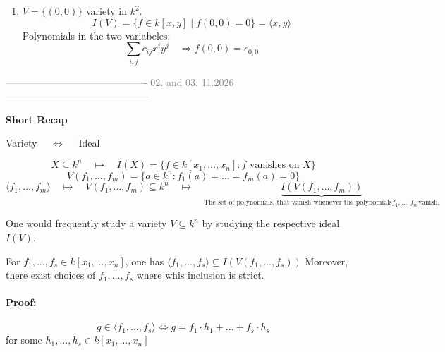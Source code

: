 \begin{example}[title = Example 1.4.9]
    \begin{enumerate}
      \item $V = \{(0,0)\}$ variety in $k^2$. \[I(V) = \{f \in k[x,y] \mid f(0,0) = 0\} = \langle x, y \rangle\] 
      Polynomials in the two variabeles: \[\sum_{i, j} c_{ij} x^i y^j \quad \Rightarrow f(0,0) = c_{0,0}\]
    \end{enumerate}
\end{example}
\vspace{0.5em}
\begin{center}
  \textcolor{gray}{------------------------------------------- 02. and 03. 11.2026 --------------------------------------------} \\[0.3em]
\end{center}
\vspace{0.3em} 

\textbf{Short Recap} 

\begin{center}
    Variety $\quad \Leftrightarrow \quad$ Ideal
\end{center}

\[X \subseteq k^n \quad \mapsto \quad I(X) = \{f \in k[x_1, \dots, x_n]: f \text{ vanishes on } X\}\] 
\[V(f_1, \ldots, f_m) = \{a \in k^n: f_1(a) = \ldots = f_m(a) = 0\}\] 
\[\langle f_1, \ldots, f_m \rangle \quad \mapsto \quad V(f_1, \ldots, f_m) \subseteq k^n\quad \mapsto \quad \underbrace{I(V(f_1, \ldots, f_m))}_{\text{The set of polynomials, that vanish whenever the polynomials} f_1, \ldots, f_m \text{vanish.}}\]

One would frequently study a variety $V \subseteq k^n$ by studying the respective ideal $I(V)$. 

\begin{lemma}[title = Lemma 1.4.10]
    For $f_1, \ldots, f_s \in k[x_1, \dots, x_n]$, one has $\langle f_1, \ldots, f_s \rangle \subseteq I(V(f_1, \ldots, f_s))$ Moreover, there exist choices of $f_1, \ldots, f_s$ where whis inclusion is strict. 

    \paragraph{Proof:} \[g \in \langle f_1, \ldots, f_s \rangle \Leftrightarrow g = f_1 \cdot h_1 + \ldots + f_s \cdot h_s\]
    for some $h_1, \ldots, h_s \in k[x_1, \dots, x_n]$
\end{lemma}
\clearpage

